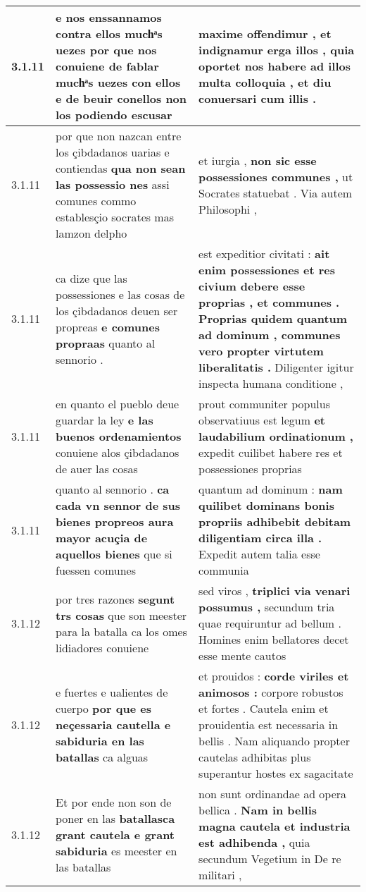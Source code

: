 \begin{tabular}{|p{1cm}|p{6.5cm}|p{6.5cm}|}
3.1.11 & e nos enssannamos contra ellos muchͣs uezes \textbf{ por que nos conuiene de fablar muchͣs uezes con ellos } e de beuir conellos non los podiendo escusar & maxime offendimur , et indignamur erga illos , \textbf{ quia oportet nos habere ad illos multa colloquia , } et diu conuersari cum illis . \\\hline
3.1.11 & por que non nazcan entre los çibdadanos uarias e contiendas \textbf{ qua non sean las possessio nes } assi comunes commo establesçio socrates mas lamzon delpho & et iurgia , \textbf{ non sic esse possessiones communes , } ut Socrates statuebat . Via autem Philosophi , \\\hline
3.1.11 & ca dize que las possessiones e las cosas de los çibdadanos deuen ser propreas \textbf{ e comunes propraas } quanto al sennorio . & est expeditior civitati : \textbf{ ait enim possessiones et res civium debere esse proprias , et communes . Proprias quidem quantum ad dominum , communes vero propter virtutem liberalitatis . } Diligenter igitur inspecta humana conditione , \\\hline
3.1.11 & en quanto el pueblo deue guardar la ley \textbf{ e las buenos ordenamientos } conuiene alos çibdadanos de auer las cosas & prout communiter populus observatiuus est legum \textbf{ et laudabilium ordinationum , } expedit cuilibet habere res et possessiones proprias \\\hline
3.1.11 & quanto al sennorio . \textbf{ ca cada vn sennor de sus bienes propreos aura mayor acuçia de aquellos bienes } que si fuessen comunes & quantum ad dominum : \textbf{ nam quilibet dominans bonis propriis adhibebit debitam diligentiam circa illa . } Expedit autem talia esse communia \\\hline
3.1.12 & por tres razones \textbf{ segunt trs cosas } que son meester para la batalla ca los omes lidiadores conuiene & sed viros , \textbf{ triplici via venari possumus , } secundum tria quae requiruntur ad bellum . Homines enim bellatores decet esse mente cautos \\\hline
3.1.12 & e fuertes e ualientes de cuerpo \textbf{ por que es neçessaria cautella e sabiduria en las batallas } ca alguas & et prouidos : \textbf{ corde viriles et animosos : } corpore robustos et fortes . Cautela enim et prouidentia est necessaria in bellis . Nam aliquando propter cautelas adhibitas plus superantur hostes ex sagacitate \\\hline
3.1.12 & Et por ende non son de poner en las \textbf{ batallasca grant cautela e grant sabiduria } es meester en las batallas & non sunt ordinandae ad opera bellica . \textbf{ Nam in bellis magna cautela et industria est adhibenda , } quia secundum Vegetium in De re militari , \\\hline

\end{tabular}
